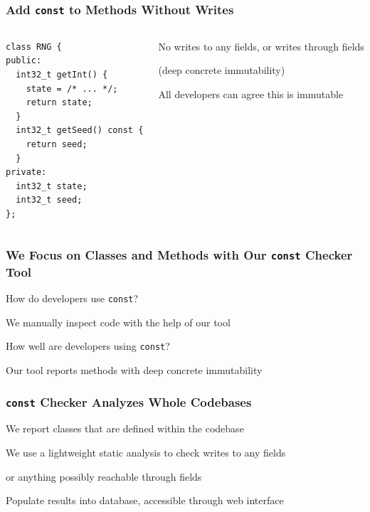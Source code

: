 \documentclass[aspectratio=169]{beamer}
\begin{document}
  \begin{frame}[fragile]
    \frametitle{Add \texttt{const} to Methods Without Writes}

    \begin{columns}
      \begin{column}{0.4\textwidth}
        \begin{lstlisting}
class RNG {
public:
  int32_t getInt() {
    state = /* ... */;
    return state;
  }
  int32_t getSeed() const {
    return seed;
  }
private:
  int32_t state;
  int32_t seed;
};
        \end{lstlisting}
      \end{column}
      \begin{column}{0.5\textwidth}
        No writes to any fields, or writes through fields

        (deep concrete immutability)

        \vspace{1em}

        All developers can agree this is immutable

        \vspace{4em}

      \end{column}
    \end{columns}
  \end{frame}

  \begin{frame}
    \frametitle{We Focus on Classes and Methods with Our \texttt{const} Checker Tool}

    How do developers use \texttt{const}?
    
    \vspace{1em}
    \hspace{1em} We manually inspect code with the help of our tool

    \vspace{4em}

    How well are developers using \texttt{const}?

    \vspace{1em}
    \hspace{1em} Our tool reports methods with deep concrete immutability
  \end{frame}

  \begin{frame}
    \frametitle{\texttt{const} Checker Analyzes Whole Codebases}

    We report classes that are defined within the codebase

    \vspace{2em}

    We use a lightweight static analysis to check writes to any
    fields

    \hspace{1em} or anything possibly reachable through fields

    \vspace{2em}

    Populate results into database, accessible through web interface
  \end{frame}
\end{document}

